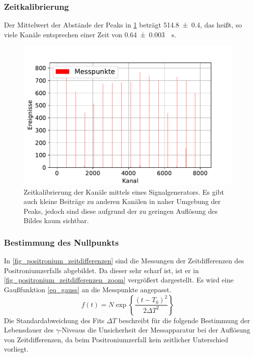 \documentclass[
	a4paper,
	12pt,
	pagesize,
	ngerman
]{scrartcl}
\begin{document}
  \subsubsection{Zeitkalibrierung}
	Der Mittelwert der Abstände der Peaks in \cref{fig_zeitkalibrierung} beträgt \SI{514.8+-0.4}{}, das heißt, so viele Kanäle entsprechen einer Zeit von \SI{0.64+-0.003}{\mu s}.

	\begin{figure}[H]
				\includegraphics[width= 0.9 \linewidth]{img/Zeitkalibrierung}
				\caption{
				Zeitkalibrierung der Kanäle mittels eines Signalgenerators.
				Es gibt auch kleine Beiträge zu anderen Kanälen in naher Umgebung der Peaks, jedoch sind diese aufgrund der zu geringen Auflösung des Bildes kaum sichtbar.
				}
				\label{fig_zeitkalibrierung}
		\end{figure}

		\subsubsection{Bestimmung des Nullpunkts}
		In \cref{fig_positronium_zeitdifferenzen} sind die Messungen der Zeitdifferenzen des Positroniumzerfalls abgebildet.
		Da dieser sehr scharf ist, ist er in \cref{fig_positronium_zeitdifferenzen_zoom} vergrößert dargestellt.
		Es wird eine Gaußfunktion \ref{eq_gauss} an die Messpunkte angepasst.
		\begin{equation}
			\label{eq_gauss}
			 f(t) = N\exp\left\{{\frac{(t-T_0)^2}{2 \Delta T^2}}\right\}
		\end{equation}
		Die Standardabweichung des Fits $\Delta T$ beschreibt für die folgende Bestimmung der Lebensdauer des $\gamma$-Niveaus die Unsicherheit der Messapparatur bei der Auflösung von Zeitdifferenzen, da beim Positroniumzerfall kein zeitlicher Unterschied vorliegt. %
\end{document}
